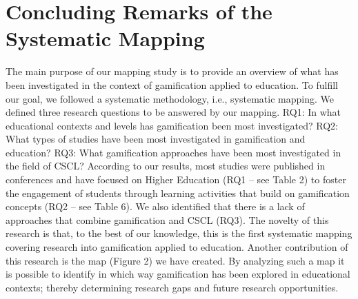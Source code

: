 \section{Concluding Remarks of the Systematic Mapping}

The main purpose of our mapping study is to provide an overview
of what has been investigated in the context of gamification applied
to education. To fulfill our goal, we followed a systematic
methodology, i.e., systematic mapping. We defined three research
questions to be answered by our mapping. RQ1: In what
educational contexts and levels has gamification been most
investigated? RQ2: What types of studies have been most
investigated in gamification and education? RQ3: What
gamification approaches have been most investigated in the field of
CSCL?
According to our results, most studies were published in
conferences and have focused on Higher Education (RQ1 – see
Table 2) to foster the engagement of students through learning
activities that build on gamification concepts (RQ2 – see Table 6).
We also identified that there is a lack of approaches that combine
gamification and CSCL (RQ3).
The novelty of this research is that, to the best of our
knowledge, this is the first systematic mapping covering research
into gamification applied to education. Another contribution of this
research is the map (Figure 2) we have created. By analyzing such
a map it is possible to identify in which way gamification has been
explored in educational contexts; thereby determining research
gaps and future research opportunities. 
